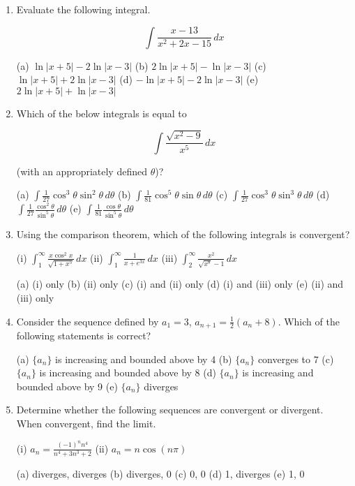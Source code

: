 \documentclass[a4paper,12pt]{article}
\begin{document}
\begin{enumerate}
    \item Evaluate the following integral.

    $$\int \frac{x-13}{x^2 + 2x - 15} \, dx$$

    (a)  $\ln|x + 5| - 2\ln|x-3|$
    (b) $2\ln|x + 5| - \ln|x-3|$
    (c) $\ln|x + 5| + 2\ln|x-3|$
    (d) $-\ln|x + 5| - 2\ln|x - 3|$
     (e) $2\ln|x + 5| + \ln|x-3|$

    \item Which of the below integrals is equal to

    $$\int \frac{\sqrt{x^2-9}}{x^5} \, dx$$

    (with an appropriately defined $\theta$)?

    (a) $\int \frac{1}{27} \cos^3 \theta \sin^2 \theta \, d\theta$
    (b) $\int \frac{1}{81} \cos^5 \theta \sin \theta \, d\theta$
    (c) $\int \frac{1}{27} \cos^3 \theta \sin^3 \theta \, d\theta$
    (d) $\int \frac{1}{27} \frac{\cos^2 \theta}{\sin^5 \theta} \, d\theta$
    (e) $\int \frac{1}{81} \frac{\cos \theta}{\sin^5 \theta} \, d\theta$


    \item Using the comparison theorem, which of the following integrals is convergent?

     (i) $\int_1^\infty \frac{x \cos^2 x}{\sqrt{1+x^5}} \, dx$
     (ii) $\int_1^\infty \frac{1}{x+e^{3x}} \, dx$
      (iii) $\int_2^\infty \frac{x^2}{\sqrt{x^8}-1} \, dx$

     (a) (i) only
     (b) (ii) only
     (c) (i) and (ii) only
     (d) (i) and (iii) only
     (e) (ii) and (iii) only

    \item Consider the sequence defined by $a_1 = 3$, $a_{n+1} = \frac{1}{2}(a_n + 8)$. Which of the following statements is correct?

    (a) $\{a_n\}$ is increasing and bounded above by 4
    (b) $\{a_n\}$ converges to 7
    (c) $\{a_n\}$ is increasing and bounded above by 8
    (d) $\{a_n\}$ is increasing and bounded above by 9
    (e) $\{a_n\}$ diverges

    \item Determine whether the following sequences are convergent or divergent. When convergent, find the limit.

    (i) $a_n = \frac{(-1)^n n^4}{n^4 + 3n^3 + 2}$
    (ii) $a_n = n \cos(n\pi)$

    (a) diverges, diverges
    (b) diverges, 0
    (c) 0, 0
    (d) 1, diverges
    (e) 1, 0
\end{enumerate}
\end{document}
